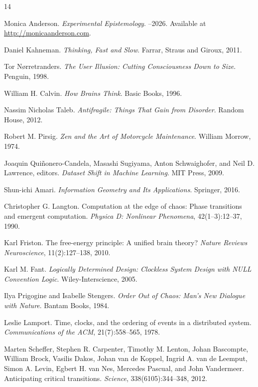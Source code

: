 \documentclass[11pt]{article}
\theoremstyle{remark}
\begin{document}
\newpage
\begin{thebibliography}{14}

Monica Anderson.
\newblock \emph{Experimental Epistemology}.
--2026. Available at \url{http://monicaanderson.com}.

Daniel Kahneman.
\newblock \emph{Thinking, Fast and Slow}.
\newblock Farrar, Straus and Giroux, 2011.

Tor N{\o}rretranders.
\newblock \emph{The User Illusion: Cutting Consciousness Down to Size}.
\newblock Penguin, 1998.

William H. Calvin.
\newblock \emph{How Brains Think}.
\newblock Basic Books, 1996.

Nassim Nicholas Taleb.
\newblock \emph{Antifragile: Things That Gain from Disorder}.
\newblock Random House, 2012.

Robert M. Pirsig.
\newblock \emph{Zen and the Art of Motorcycle Maintenance}.
\newblock William Morrow, 1974.

Joaquin Qui{\~n}onero-Candela, Masashi Sugiyama, Anton Schwaighofer, and Neil D. Lawrence, editors.
\newblock \emph{Dataset Shift in Machine Learning}.
\newblock MIT Press, 2009.

Shun-ichi Amari.
\newblock \emph{Information Geometry and Its Applications}.
\newblock Springer, 2016.

Christopher G. Langton.
\newblock Computation at the edge of chaos: Phase transitions and emergent computation.
\newblock \emph{Physica D: Nonlinear Phenomena}, 42(1--3):12--37, 1990.

Karl Friston.
\newblock The free-energy principle: A unified brain theory?
\newblock \emph{Nature Reviews Neuroscience}, 11(2):127--138, 2010.

Karl M. Fant.
\newblock \emph{Logically Determined Design: Clockless System Design with NULL Convention Logic}.
\newblock Wiley-Interscience, 2005.

Ilya Prigogine and Isabelle Stengers.
\newblock \emph{Order Out of Chaos: Man's New Dialogue with Nature}.
\newblock Bantam Books, 1984.

Leslie Lamport.
\newblock Time, clocks, and the ordering of events in a distributed system.
\newblock \emph{Communications of the ACM}, 21(7):558--565, 1978.

Marten Scheffer, Stephen R. Carpenter, Timothy M. Lenton, Johan Bascompte, William Brock, Vasilis Dakos, Johan van de Koppel, Ingrid A. van de Leemput, Simon A. Levin, Egbert H. van Nes, Mercedes Pascual, and John Vandermeer.
\newblock Anticipating critical transitions.
\newblock \emph{Science}, 338(6105):344--348, 2012.


\end{thebibliography}
\end{document}
